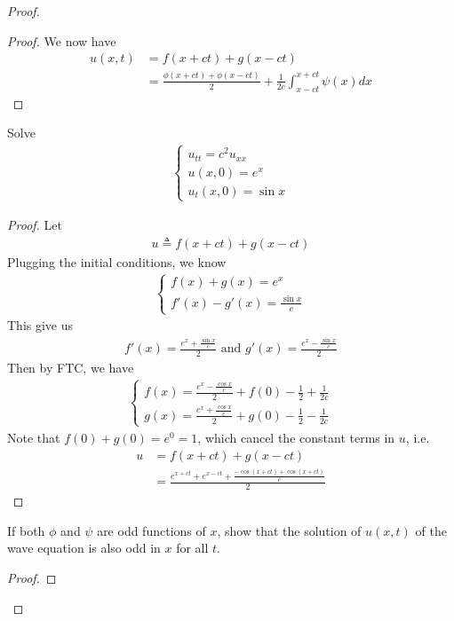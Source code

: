 \documentclass{report}
\begin{document}
\begin{proof}
\begin{proof}
We now have 
\begin{align*}
u(x,t)&=f(x+ct)+g(x-ct)\\
&=\frac{\phi (x+ct)+\phi (x-ct)}{2}+ \frac{1}{2c} \int^{x+ct}_{x-ct}\psi (x)dx
\end{align*}
\end{proof}
\begin{question}{}{}
Solve 
\begin{align*}
\begin{cases}
  u_{tt}=c^2u_{xx} \\
  u(x,0)=e^x \\
  u_t(x,0)= \sin x 
\end{cases}
\end{align*}
\end{question}
\begin{proof}
Let 
\begin{align*}
u\triangleq f(x+ct)+g(x-ct)
\end{align*}
Plugging the initial conditions, we know 
\begin{align*}
\begin{cases}
 f(x)+g(x)=e^x \\
 f'(x)-g'(x)= \frac{\sin x}{c} 
\end{cases}
\end{align*}
This give us 
\begin{align*}
f'(x)= \frac{e^x+ \frac{\sin x}{c}}{2}\text{ and }g'(x)= \frac{e^x - \frac{\sin x}{c}}{2}
\end{align*}
Then by FTC, we have
\begin{align*}
\begin{cases}
  f(x)= \frac{e^x-\frac{\cos x}{c}}{2}+f(0)- \frac{1}{2} +\frac{1}{2c} \\
  g(x)= \frac{e^x + \frac{\cos x}{c}}{2} +g(0) - \frac{1}{2}- \frac{1}{2c}
\end{cases}
\end{align*}
Note that $f(0)+g(0)=e^0=1$, which cancel the constant terms in $u$, i.e.
\begin{align*}
u&=f(x+ct)+g(x-ct)\\
&=\frac{e^{x+ct}+ e^{x-ct} + \frac{-\cos (x+ct)+ \cos (x+ct)}{c}}{2}
\end{align*}
\end{proof}
\begin{question}{}{}
If both $\phi$ and $\psi$ are odd functions of $x$, show that the solution of  $u(x,t)$ of the wave equation is also odd in $x$ for all $t$. 
\end{question}
\begin{proof}

\end{proof}
\end{proof}
\end{document}
